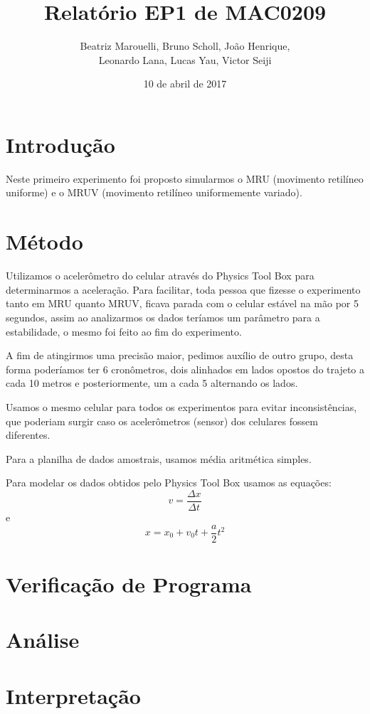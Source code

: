 \documentclass[a4paper, 12pt]{article}
\title{Relatório EP1 de MAC0209}
\author{Beatriz Marouelli, Bruno Scholl, João Henrique, 
\\ Leonardo Lana, Lucas Yau, Victor Seiji}
\date{10 de abril de 2017}
\begin{document}
\maketitle

\section*{Introdução}
Neste primeiro experimento foi proposto simularmos o MRU (movimento retilíneo uniforme) 
e o MRUV (movimento retilíneo uniformemente variado). 

\section*{Método}
Utilizamos o acelerômetro do celular através do Physics Tool Box para
determinarmos a aceleração. Para facilitar, toda pessoa que fizesse o experimento 
tanto em MRU quanto MRUV, ficava parada com o celular estável na mão por 5 segundos, 
assim ao analizarmos os dados teríamos um parâmetro para a estabilidade, o mesmo 
foi feito ao fim do experimento.

A fim de atingirmos uma precisão maior, pedimos auxílio de outro grupo, desta
forma poderíamos ter 6 cronômetros, dois alinhados em lados opostos do trajeto
a cada 10 metros e posteriormente, um a cada 5 alternando os lados.

Usamos o mesmo celular para todos os experimentos para evitar inconsistências,
que poderiam surgir caso os acelerômetros (sensor) dos celulares fossem diferentes.

Para a planilha de dados amostrais, usamos média aritmética simples.

Para modelar os dados obtidos pelo Physics Tool Box usamos as equações: 
$$v = \frac{\Delta x}{\Delta t}$$ e $$x = x_0 + v_0 t + \frac{a}{2} t^2$$

\section*{Verificação de Programa}

\section*{Análise}

\section*{Interpretação}
\end{document}
